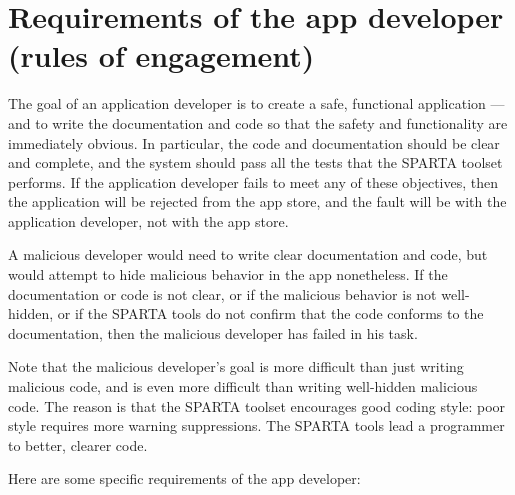 \htmlhr
\chapter{Requirements of the app developer (rules of engagement)\label{rules-of-engagement}}

The goal of an application developer is to create a safe, functional
application --- and to write the documentation and code so that the safety
and functionality are immediately obvious.  In particular, the code and
documentation should be clear and complete, and the system should pass all
the tests that the SPARTA toolset performs.  If the application developer
fails to meet any of these objectives, then the application will be
rejected from the app store, and the fault will be with the application
developer, not with the app store.

A malicious developer would need to write clear documentation and code, but
would attempt to hide malicious behavior in the app nonetheless.  If the
documentation or code is not clear, or if the malicious behavior is not
well-hidden, or if the SPARTA tools do not confirm that the code conforms
to the documentation, then the malicious developer has failed in his task.

Note that the malicious developer's goal is more difficult than just
writing malicious code, and is even more difficult than writing well-hidden
malicious code.  The reason is that the SPARTA toolset encourages good
coding style:  poor style requires more warning suppressions.
The SPARTA tools lead a programmer to better, clearer code.


Here are some specific requirements of the app developer:

